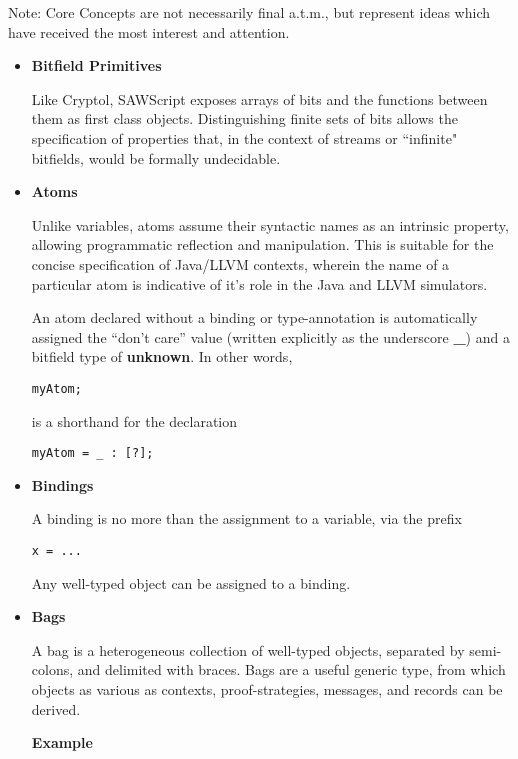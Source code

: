 \documentclass[11pt]{amsart}
\renewcommand{\b}[1]{\textbf{#1}}
\begin{document}
Note: Core Concepts are not necessarily final a.t.m., but represent ideas which have received the most interest and attention.

\begin{itemize}
\item \b{Bitfield Primitives}

Like Cryptol, SAWScript exposes arrays of bits and the functions between them as first class objects.  Distinguishing finite sets of bits allows the specification of properties that, in the context of streams or ``infinite" bitfields, would be formally undecidable.

\item \b{Atoms}

Unlike variables, atoms assume their syntactic names as an intrinsic property, allowing programmatic reflection and manipulation.  This is suitable for the concise specification of Java/LLVM contexts, wherein the name of a particular atom is indicative of it's role in the Java and LLVM simulators.

An atom declared without a binding or type-annotation is automatically assigned the ``don't care'' value (written explicitly as the underscore \b{\_}) and a bitfield type of \b{unknown}.  In other words,

\begin{verbatim}
myAtom;
\end{verbatim}

is a shorthand for the declaration

\begin{verbatim}
myAtom = _ : [?];
\end{verbatim}

\item \b{Bindings}

A binding is no more than the assignment to a variable, via the prefix

\begin{verbatim}
x = ...
\end{verbatim}

Any well-typed object can be assigned to a binding.

\item \b{Bags}

A bag is a heterogeneous collection of well-typed objects, separated by semi-colons, and delimited with braces.  Bags are a useful generic type, from which objects as various as contexts, proof-strategies, messages, and records can be derived.

\b{Example}


\end{itemize}
\end{document}
